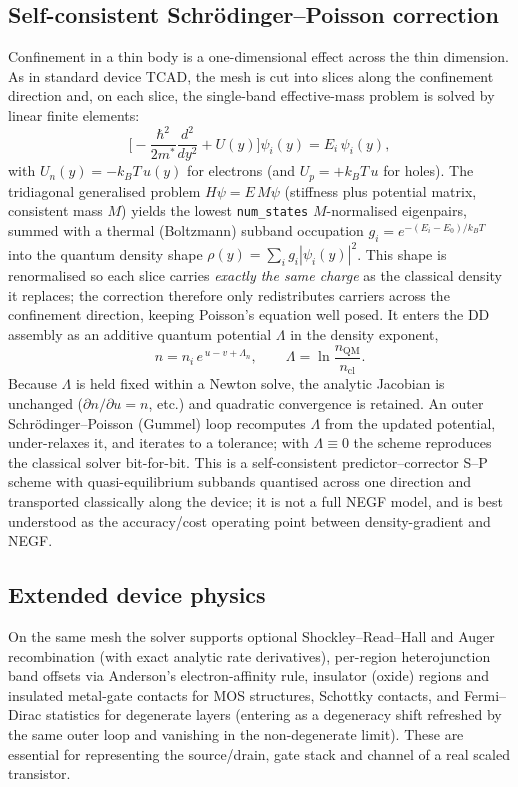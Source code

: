 \documentclass[conference]{IEEEtran}
\begin{document}
\subsection{Self-consistent Schr\"odinger--Poisson correction}
\label{sec:sp}
Confinement in a thin body is a one-dimensional effect across the thin dimension.
As in standard device TCAD, the mesh is cut into slices along the confinement
direction and, on each slice, the single-band effective-mass problem is solved by
linear finite elements:
\begin{equation}
\Big[-\frac{\hbar^2}{2m^*}\frac{d^2}{dy^2}+U(y)\Big]\psi_i(y)=E_i\,\psi_i(y),
\end{equation}
with $U_n(y)=-k_BT\,u(y)$ for electrons (and $U_p=+k_BT\,u$ for holes). The
tridiagonal generalised problem $H\psi=E\,M\psi$ (stiffness plus potential matrix,
consistent mass $M$) yields the lowest \texttt{num\_states} $M$-normalised
eigenpairs, summed with a thermal (Boltzmann) subband occupation
$g_i=e^{-(E_i-E_0)/k_BT}$ into the quantum density shape
$\rho(y)=\sum_i g_i|\psi_i(y)|^2$. This shape is renormalised so each slice carries
\emph{exactly the same charge} as the classical density it replaces; the
correction therefore only redistributes carriers across the confinement direction,
keeping Poisson's equation well posed. It enters the DD assembly as an additive
quantum potential $\Lambda$ in the density exponent,
\begin{equation}
n=n_i\,e^{\,u-v+\Lambda_n},\qquad \Lambda=\ln\!\frac{n_{\mathrm{QM}}}{n_{\mathrm{cl}}}.
\end{equation}
Because $\Lambda$ is held fixed within a Newton solve, the analytic Jacobian is
unchanged ($\partial n/\partial u=n$, etc.) and quadratic convergence is retained.
An outer Schr\"odinger--Poisson (Gummel) loop recomputes $\Lambda$ from the updated
potential, under-relaxes it, and iterates to a tolerance; with $\Lambda\equiv0$ the
scheme reproduces the classical solver bit-for-bit. This is a self-consistent
predictor--corrector S--P scheme with quasi-equilibrium subbands quantised across
one direction and transported classically along the device; it is not a full NEGF
model, and is best understood as the accuracy/cost operating point between
density-gradient and NEGF.

\subsection{Extended device physics}
\label{sec:fd}
On the same mesh the solver supports optional Shockley--Read--Hall and Auger
recombination (with exact analytic rate derivatives), per-region heterojunction
band offsets via Anderson's electron-affinity rule, insulator (oxide) regions and
insulated metal-gate contacts for MOS structures, Schottky contacts, and
Fermi--Dirac statistics for degenerate layers (entering as a degeneracy shift
refreshed by the same outer loop and vanishing in the non-degenerate limit). These
are essential for representing the source/drain, gate stack and channel of a real
scaled transistor.
\end{document}
